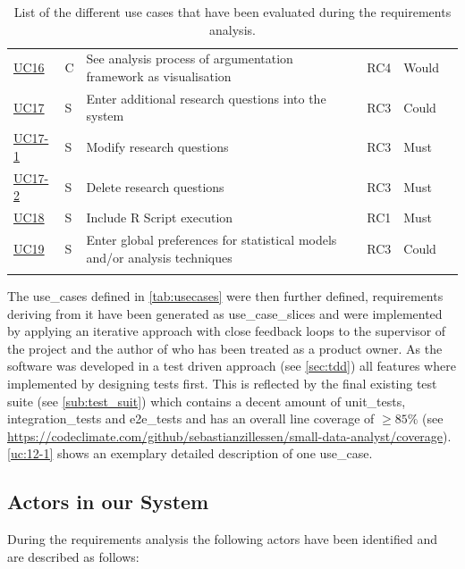 \begin{landscape}
\begin{longtable}{ l l p{10.5cm} l l p{3cm} }
		\href{https://trello.com/c/3FCcFdmm}{UC16}  &   C & 	See analysis process of argumentation framework as visualisation & RC4 & Would	&    \\
		\href{https://trello.com/c/Hv2xe2UW}{UC17}  &   S & 	Enter additional research questions into the system & RC3 &Could& \\
		\href{https://trello.com/c/w1YiIgU7}{UC17-1}&   S & 	Modify research questions&RC3 & Must &  \\
		\href{https://trello.com/c/UbT5mtDx}{UC17-2}&   S & 	Delete research questions&RC3&Must& \\
		\href{https://trello.com/c/dpLHOxbB}{UC18}  &   S & 	Include R Script execution	 & RC1 & Must & \\
		\href{https://trello.com/c/bZHdWpkt}{UC19}  &   S & 	Enter global preferences for statistical models and/or analysis techniques& RC3 & Could &	 \\

		\caption{List of the different use cases that have been evaluated during the requirements analysis.}	
		\label{tab:usecases}
	\end{longtable}
\end{landscape}

The \glspl{use_case} defined in \autoref{tab:usecases} were then further defined, requirements deriving from it have been generated as \glspl{use_case_slice} and were implemented by applying an iterative approach with close feedback loops to the supervisor of the project and the author of \cite{sassoon2014,sassoon2016, sassoon2016CD} who has been treated as a product owner. As the software was developed in a test driven approach (see \autoref{sec:tdd}) all features where implemented by designing tests first. This is reflected by the final existing test suite (see \autoref{sub:test_suit}) which contains a decent amount of \glspl{unit_test}, \glspl{integration_test} and \glspl{e2e_test} and has an overall line coverage of $ \geq 85\%$ (see \href{https://codeclimate.com/github/sebastianzillessen/small-data-analyst/coverage}{https://codeclimate.com/github/sebastianzillessen/small-data-analyst/coverage}). \autoref{uc:12-1} shows an exemplary detailed description of one \gls{use_case}.





\subsection{Actors in our System}
\label{sub:sassoon:actors}
During the requirements analysis the following actors have been identified and are described as follows:

